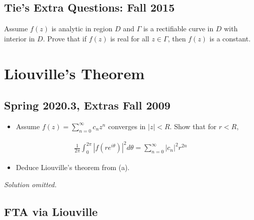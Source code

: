 \hypertarget{ties-extra-questions-fall-2015-2}{%
\subsection{Tie's Extra Questions: Fall
2015}\label{ties-extra-questions-fall-2015-2}}

Assume \(f(z)\) is analytic in region \(D\) and \(\Gamma\) is a
rectifiable curve in \(D\) with interior in \(D\). Prove that if
\(f(z)\) is real for all \(z \in \Gamma\), then \(f(z)\) is a constant.

\hypertarget{liouvilles-theorem}{%
\section{Liouville's Theorem}\label{liouvilles-theorem}}

\hypertarget{spring-2020.3-extras-fall-2009}{%
\subsection{Spring 2020.3, Extras Fall
2009}\label{spring-2020.3-extras-fall-2009}}

\begin{problem}[?]

\envlist

\begin{itemize}
\tightlist
\item
  Assume \(f(z)=\sum_{n=0}^{\infty} c_{n} z^{n}\) converges in
  \(|z|<R\). Show that for \(r<R\),
\end{itemize}

\begin{align*}
\frac{1}{2 \pi} \int_{0}^{2 \pi}\left|f\left(r e^{i \theta}\right)\right|^{2} d \theta=\sum_{n=0}^{\infty}\left|c_{n}\right|^{2} r^{2 n}
\end{align*}

\begin{itemize}
\tightlist
\item
  Deduce Liouville's theorem from (a).
\end{itemize}

\end{problem}

\emph{Solution omitted.}

\hypertarget{fta-via-liouville}{%
\subsection{FTA via Liouville}\label{fta-via-liouville}}

